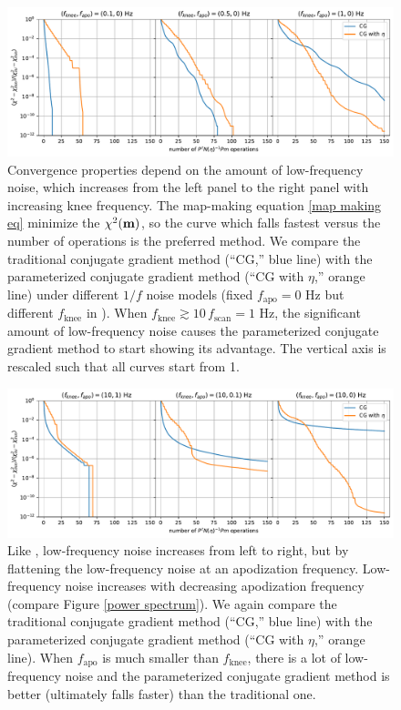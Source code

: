 \documentclass[twocolumn,linenumbers]{aastex631}
\newcommand{\Eq}[1]{\text{Eq.\,\ref{#1}}}
\newcommand{\Figure}[1]{\text{Figure \ref{#1}}}
\newcommand{\vbm}{\vb{m}}
\begin{document}
\begin{CJK*}{UTF8}{gbsn}
\begin{figure}[tb!]
\centering
\includegraphics[width=\textwidth]{pink_noise_chi2.pdf}
\caption{
    Convergence properties depend on the amount of low-frequency noise,
    which increases from the left panel to the right panel with increasing knee frequency.
    The map-making equation \ref{map making eq} minimize the $\chi^2(\vbm)$, so
    the curve which falls fastest versus the number of operations is the preferred method.
    We compare the traditional conjugate gradient method (``{CG},'' blue line)
    with the parameterized conjugate gradient method (``{CG with $\eta$},'' orange line)
    under different $1/f$ noise models (fixed $f_\text{apo}=0$ Hz but different $f_\text{knee}$ in \Eq{noise power spectrum}).
    When $f_\text{knee} \gtrsim 10\,f_\text{scan} = 1$ Hz, the significant amount of
    low-frequency noise causes the parameterized conjugate gradient method to start showing its advantage.  The vertical axis is rescaled  such that all curves start from 1.
}
\label{1/f noise chi2}
\end{figure}

\begin{figure}[tb!]
\centering
\includegraphics[width=\textwidth]{flattened_noise_chi2.pdf}
\caption{Like \Figure{1/f noise chi2}, low-frequency noise increases from left to right, but by flattening the low-frequency noise at an apodization frequency.
    Low-frequency noise increases with decreasing apodization frequency (compare Figure \ref{power spectrum}).
    We again compare the traditional conjugate gradient method (``{CG},'' blue line) 
    with the parameterized conjugate gradient method (``{CG with $\eta$},'' orange line).
    When $f_\text{apo}$ is much smaller than $f_\text{knee}$, there is a lot of low-frequency noise and
    the parameterized conjugate gradient method is better (ultimately falls faster) than the traditional one.
}
\label{apo noise chi2}
\end{figure}


\end{CJK*}
\end{document}
